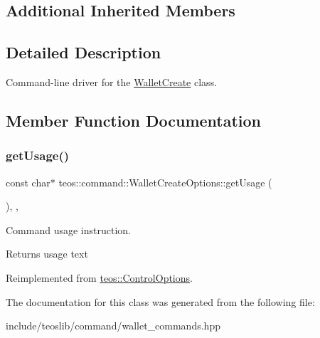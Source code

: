 \subsection*{Additional Inherited Members}


\subsection{Detailed Description}
Command-\/line driver for the \mbox{\hyperlink{classteos_1_1command_1_1_wallet_create}{Wallet\+Create}} class. 

\subsection{Member Function Documentation}
\mbox{\label{classteos_1_1command_1_1_wallet_create_options_ad20c1955cb48f6c9e640c35eae091c30}} 
\subsubsection{\texorpdfstring{get\+Usage()}{getUsage()}}
{\footnotesize\ttfamily const char$\ast$ teos\+::command\+::\+Wallet\+Create\+Options\+::get\+Usage (\begin{DoxyParamCaption}{ }\end{DoxyParamCaption})\hspace{0.3cm}{\ttfamily [inline]}, {\ttfamily [protected]}, {\ttfamily [virtual]}}



Command \textquotesingle{}usage\textquotesingle{} instruction. 

\begin{DoxyReturn}{Returns}
usage text 
\end{DoxyReturn}


Reimplemented from \mbox{\hyperlink{classteos_1_1_control_options_a0aa5671f9bc750ed5280c26c543874f3}{teos\+::\+Control\+Options}}.



The documentation for this class was generated from the following file\+:\begin{DoxyCompactItemize}
\item 
include/teoslib/command/wallet\+\_\+commands.\+hpp\end{DoxyCompactItemize}
